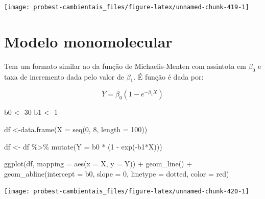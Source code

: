 \documentclass[
]{book}
\newenvironment{Shaded}{\begin{snugshade}}{\end{snugshade}}
\newcommand{\AttributeTok}[1]{\textcolor[rgb]{0.77,0.63,0.00}{#1}}
\newcommand{\DecValTok}[1]{\textcolor[rgb]{0.00,0.00,0.81}{#1}}
\newcommand{\FunctionTok}[1]{\textcolor[rgb]{0.00,0.00,0.00}{#1}}
\newcommand{\NormalTok}[1]{#1}
\newcommand{\OtherTok}[1]{\textcolor[rgb]{0.56,0.35,0.01}{#1}}
\newcommand{\SpecialCharTok}[1]{\textcolor[rgb]{0.00,0.00,0.00}{#1}}
\newcommand{\StringTok}[1]{\textcolor[rgb]{0.31,0.60,0.02}{#1}}
\begin{document}
\begin{center}\texttt{[image: probest-cambientais\_files/figure-latex/unnamed-chunk-419-1]} \end{center}

\hypertarget{modelo-monomolecular}{%
\section{Modelo monomolecular}\label{modelo-monomolecular}}

Tem um formato similar ao da função de Michaelis-Menten com assintota em \(\beta_0\) e taxa de incremento dada pelo valor de \(\beta_1\). É função é dada por:

\[Y = \beta_0 (1 - e^{-\beta_1 X})\]

\begin{Shaded}
\begin{Highlighting}[]
\NormalTok{b0 }\OtherTok{\textless{}{-}} \DecValTok{30}
\NormalTok{b1 }\OtherTok{\textless{}{-}} \DecValTok{1}

\NormalTok{df }\OtherTok{\textless{}{-}}\FunctionTok{data.frame}\NormalTok{(}\AttributeTok{X =} \FunctionTok{seq}\NormalTok{(}\DecValTok{0}\NormalTok{, }\DecValTok{8}\NormalTok{, }\AttributeTok{length =} \DecValTok{100}\NormalTok{))}

\NormalTok{df }\OtherTok{\textless{}{-}}\NormalTok{ df }\SpecialCharTok{\%\textgreater{}\%} \FunctionTok{mutate}\NormalTok{(}\AttributeTok{Y =}\NormalTok{ b0 }\SpecialCharTok{*}\NormalTok{ (}\DecValTok{1} \SpecialCharTok{{-}} \FunctionTok{exp}\NormalTok{(}\SpecialCharTok{{-}}\NormalTok{b1}\SpecialCharTok{*}\NormalTok{X)))}

\FunctionTok{ggplot}\NormalTok{(df, }\AttributeTok{mapping =} \FunctionTok{aes}\NormalTok{(}\AttributeTok{x =}\NormalTok{ X, }\AttributeTok{y =}\NormalTok{ Y)) }\SpecialCharTok{+}
  \FunctionTok{geom\_line}\NormalTok{() }\SpecialCharTok{+}
  \FunctionTok{geom\_abline}\NormalTok{(}\AttributeTok{intercept =}\NormalTok{ b0, }\AttributeTok{slope =} \DecValTok{0}\NormalTok{, }\AttributeTok{linetype =} \StringTok{\textquotesingle{}dotted\textquotesingle{}}\NormalTok{, }\AttributeTok{color =} \StringTok{\textquotesingle{}red\textquotesingle{}}\NormalTok{)}
\end{Highlighting}
\end{Shaded}

\begin{center}\texttt{[image: probest-cambientais\_files/figure-latex/unnamed-chunk-420-1]} \end{center}
\end{document}
